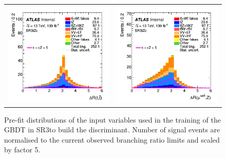 \begin{figure}[!htbp]
\begin{tabular}{cc}
		\includegraphics[width=.45\textwidth]{Chapters/CH6/figures/SR3_UsingSMT/ttbar_dR} &
		\includegraphics[width=.45\textwidth]{Chapters/CH6/figures/SR3_UsingSMT/softmuZ_dR} \\
	\end{tabular}
	\caption{Pre-fit distributions of the input variables used in the training of the GBDT in SR3\tZc to build the \Dthree discriminant. Number of signal events are normalised to the current observed branching ratio limits and scaled by factor 5.  
		\ErrStatOnly
		\Blinded
	}%
	\label{fig:separation:SR3}
\end{figure}

\clearpage

